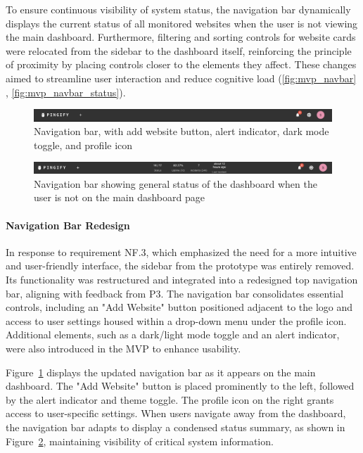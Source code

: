 To ensure continuous visibility of system status, the navigation bar dynamically displays the current status of all monitored websites when the user is not viewing the main dashboard. Furthermore, filtering and sorting controls for website cards were relocated from the sidebar to the dashboard itself, reinforcing the principle of proximity by placing controls closer to the elements they affect. These changes aimed to streamline user interaction and reduce cognitive load (\autoref{fig:mvp_navbar} , \autoref{fig:mvp_navbar_status}).

\begin{figure}[H]
\centering
\includegraphics[width=1\linewidth]{figures/MVP-dashboard/navbar-mvp.png}
\caption{Navigation bar, with add website button, alert indicator, dark mode toggle, and profile icon}
\label{fig:mvp_navbar}
\end{figure}

\begin{figure}[H]
\centering
\includegraphics[width=1\linewidth]{figures/MVP-dashboard/navbar-mvp-status.png}
\caption{Navigation bar showing general status of the dashboard when the user is not on the main dashboard page}
\label{fig:mvp_navbar_status}
\end{figure}


\paragraph{Navigation Bar Redesign}

In response to requirement NF.3, which emphasized the need for a more intuitive and user-friendly interface, the sidebar from the prototype was entirely removed. Its functionality was restructured and integrated into a redesigned top navigation bar, aligning with feedback from P3. The navigation bar consolidates essential controls, including an "Add Website" button positioned adjacent to the logo and access to user settings housed within a drop-down menu under the profile icon. Additional elements, such as a dark/light mode toggle and an alert indicator, were also introduced in the MVP to enhance usability.

Figure~\ref{fig:mvp_navbar} displays the updated navigation bar as it appears on the main dashboard. The "Add Website" button is placed prominently to the left, followed by the alert indicator and theme toggle. The profile icon on the right grants access to user-specific settings. When users navigate away from the dashboard, the navigation bar adapts to display a condensed status summary, as shown in Figure~\ref{fig:mvp_navbar_status}, maintaining visibility of critical system information.

